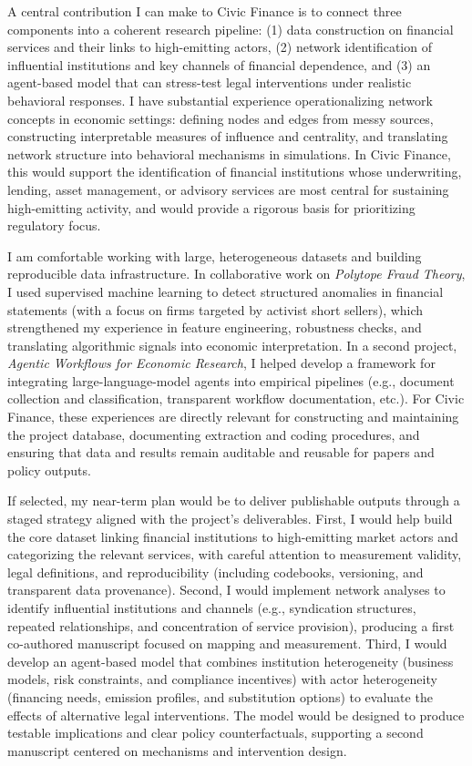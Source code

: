\documentclass[11pt]{article}
\begin{document}
A central contribution I can make to Civic Finance is to connect three components into a coherent research pipeline: (1) data construction on financial services and their links to high-emitting actors, (2) network identification of influential institutions and key channels of financial dependence, and (3) an agent-based model that can stress-test legal interventions under realistic behavioral responses. I have substantial experience operationalizing network concepts in economic settings: defining nodes and edges from messy sources, constructing interpretable measures of influence and centrality, and translating network structure into behavioral mechanisms in simulations. In Civic Finance, this would support the identification of financial institutions whose underwriting, lending, asset management, or advisory services are most central for sustaining high-emitting activity, and would provide a rigorous basis for prioritizing regulatory focus.

I am comfortable working with large, heterogeneous datasets and building reproducible data infrastructure. In collaborative work on \emph{Polytope Fraud Theory}, I used supervised machine learning to detect structured anomalies in financial statements (with a focus on firms targeted by activist short sellers), which strengthened my experience in feature engineering, robustness checks, and translating algorithmic signals into economic interpretation. In a second project, \emph{Agentic Workflows for Economic Research}, I helped develop a framework for integrating large-language-model agents into empirical pipelines (e.g., document collection and classification, transparent workflow documentation, etc.). For Civic Finance, these experiences are directly relevant for constructing and maintaining the project database, documenting extraction and coding procedures, and ensuring that data and results remain auditable and reusable for papers and policy outputs.

If selected, my near-term plan would be to deliver publishable outputs through a staged strategy aligned with the project’s deliverables. First, I would help build the core dataset linking financial institutions to high-emitting market actors and categorizing the relevant services, with careful attention to measurement validity, legal definitions, and reproducibility (including codebooks, versioning, and transparent data provenance). Second, I would implement network analyses to identify influential institutions and channels (e.g., syndication structures, repeated relationships, and concentration of service provision), producing a first co-authored manuscript focused on mapping and measurement. Third, I would develop an agent-based model that combines institution heterogeneity (business models, risk constraints, and compliance incentives) with actor heterogeneity (financing needs, emission profiles, and substitution options) to evaluate the effects of alternative legal interventions. The model would be designed to produce testable implications and clear policy counterfactuals, supporting a second manuscript centered on mechanisms and intervention design.
\end{document}
